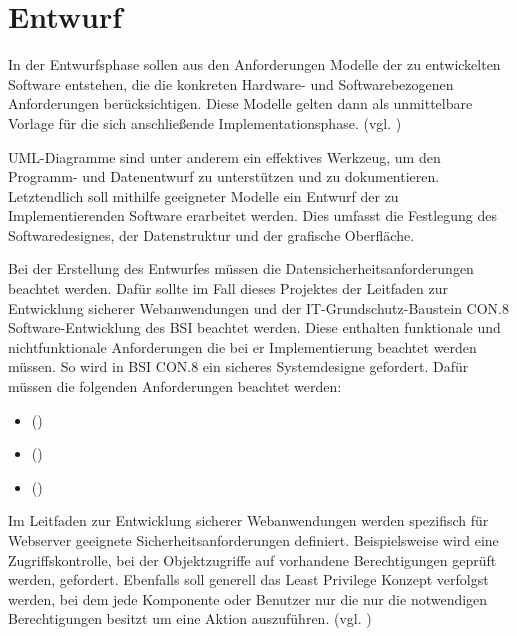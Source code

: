 \section{Entwurf}
\label{sec:Entwurf}
In der Entwurfsphase sollen aus den Anforderungen Modelle der zu entwickelten Software entstehen, die die konkreten Hardware- und Softwarebezogenen Anforderungen berücksichtigen. Diese Modelle gelten dann als unmittelbare Vorlage für die sich anschließende Implementationsphase. (vgl. \cite[S. 69]{dumke-2003})

UML-Diagramme sind unter anderem ein effektives Werkzeug, um den Programm- und Datenentwurf zu unterstützen und zu dokumentieren. Letztendlich soll mithilfe geeigneter Modelle ein Entwurf der zu Implementierenden Software erarbeitet werden. Dies umfasst die Festlegung des Softwaredesignes, der Datenstruktur und der grafische Oberfläche.

Bei der Erstellung des Entwurfes müssen die Datensicherheitsanforderungen beachtet werden. Dafür sollte im Fall dieses Projektes der Leitfaden zur Entwicklung sicherer Webanwendungen und der IT-Grundschutz-Baustein CON.8 Software-Entwicklung des BSI beachtet werden. Diese enthalten funktionale und nichtfunktionale Anforderungen die bei er Implementierung beachtet werden müssen. So wird in BSI CON.8 ein sicheres Systemdesigne gefordert. Dafür müssen \ua die folgenden Anforderungen beachtet werden:
\begin{itemize}
    \item  {} (\cite[S.5]{BSICON8})
    \item  {} (\cite[S.5]{BSICON8})
    \item  {} (\cite[S.5]{BSICON8})
\end{itemize}

Im Leitfaden zur Entwicklung sicherer Webanwendungen werden spezifisch für Webserver geeignete Sicherheitsanforderungen definiert. Beispielsweise wird eine Zugriffskontrolle, bei der Objektzugriffe auf vorhandene Berechtigungen geprüft werden, gefordert. Ebenfalls soll generell das Least Privilege Konzept verfolgst werden, bei dem jede Komponente oder Benutzer nur die nur die notwendigen Berechtigungen besitzt um eine Aktion auszuführen. (vgl. \cite{BSIWeb})

